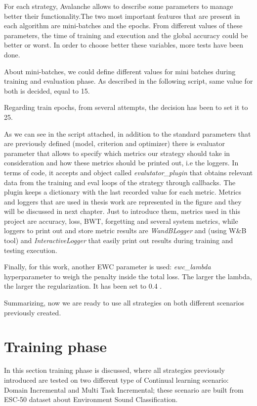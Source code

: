 \documentclass[english, LaM, oneside]{sapthesis}%
\begin{document}
\vspace{5mm}
For each strategy, Avalanche allows to describe some parameters to manage better their functionality.The two most important features that are present in each algorithm are mini-batches and the epochs. From different values of these parameters, the time of training and execution and the global accuracy could be better or worst. In order to choose better these variables, more tests have been done. 

About mini-batches, we could define different values for mini batches during training and evaluation phase. As described in the following script, same value for both is decided, equal to 15.

Regarding train epochs, from several attempts, the decision has been to set it to 25.


As we can see in the script attached, in addition to the standard parameters that are previously defined (model, criterion and optimizer) there is evaluator parameter that allows to specify which metrics our strategy should take in consideration and how these metrics should be printed out, i.e the loggers. In terms of code, it accepts and object called \textit{evalutator\_plugin} that obtains relevant data from the training and eval loops of the strategy through callbacks. The plugin keeps a dictionary with the last recorded value for each metric. Metrics and loggers that are used in thesis work are represented in the figure and they will be discussed in next chapter. Just to introduce them, metrics used in this project are accuracy, loss, BWT, forgetting and several system metrics, while loggers to print out and store metric results are \textit{WandBLogger} and (using W&B tool) and \textit{InteractiveLogger} that easily print out results during training and testing execution.

Finally, for this work, another EWC parameter is used: \textit{ewc\_lambda}  hyperparameter to weigh the penalty inside the total loss. The larger the lambda, the larger the regularization. It has been set to 0.4 .


Summarizing, now we are ready to use all strategies on both different scenarios previously created. 

\section{Training phase}
In this section training phase is discussed, where all strategies previously introduced are tested on two different type of Continual learning scenario: Domain Incremental and Multi Task Incremental; these scenario are built from ESC-50 dataset about Environment Sound Classification. 
\end{document}
